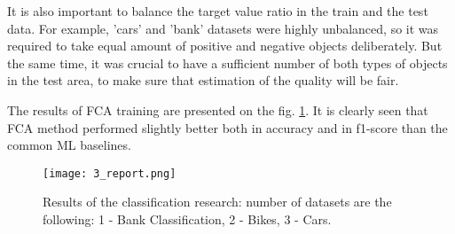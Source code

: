 It is also important to balance the target value ratio in the train and the test data. 
For example, 'cars' and 'bank' datasets were highly unbalanced, so it was required to take equal amount of positive and negative objects deliberately.
But the same time, it was crucial to have a sufficient number of both types of objects in the test area, to make sure that estimation of the quality will be fair.

The results of FCA training are presented on the fig. \ref{fig:fca}.
It is clearly seen that FCA method performed slightly better both in accuracy and in f1-score than the common ML baselines.

\begin{figure}[h]
\centering
\texttt{[image: 3\_report.png]}
\caption{Results of the classification research: number of datasets are the following: 1 - Bank Classification, 2 - Bikes, 3 - Cars.}
\label{fig:fca}
\end{figure}